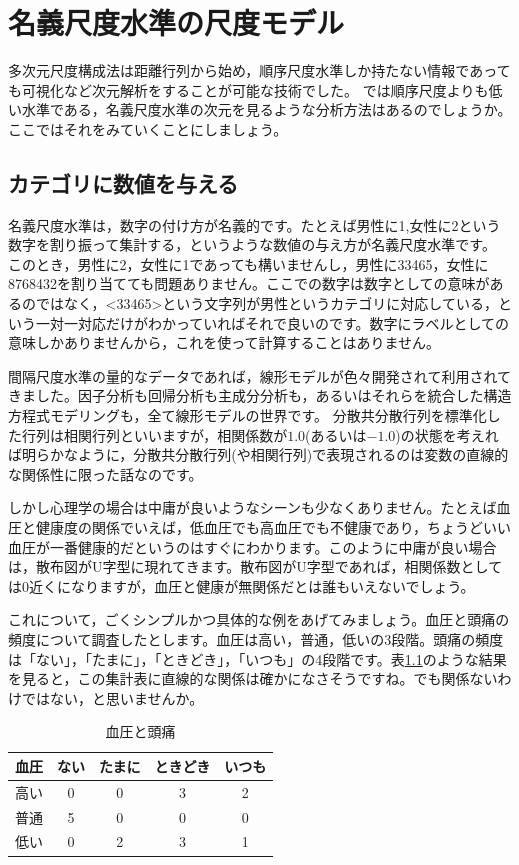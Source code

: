 \documentclass{ltjsbook}
\begin{document}
\chapter{名義尺度水準の尺度モデル}
\label{H09_dual}

多次元尺度構成法は距離行列から始め，順序尺度水準しか持たない情報であっても可視化など次元解析をすることが可能な技術でした。
では順序尺度よりも低い水準である，名義尺度水準の次元を見るような分析方法はあるのでしょうか。ここではそれをみていくことにしましょう。

\section{カテゴリに数値を与える}

名義尺度水準は，数字の付け方が名義的です。たとえば男性に1,女性に2という数字を割り振って集計する，というような数値の与え方が名義尺度水準です。
このとき，男性に2，女性に1であっても構いませんし，男性に33465，女性に8768432を割り当てても問題ありません。ここでの数字は数字としての意味があるのではなく，<33465>という文字列が男性というカテゴリに対応している，という一対一対応だけがわかっていればそれで良いのです。数字にラベルとしての意味しかありませんから，これを使って計算することはありません。

間隔尺度水準の量的なデータであれば，線形モデルが色々開発されて利用されてきました。因子分析も回帰分析も主成分分析も，あるいはそれらを統合した構造方程式モデリングも，全て線形モデルの世界です。
分散共分散行列を標準化した行列は相関行列といいますが，相関係数が$1.0$(あるいは$-1.0$)の状態を考えれば明らかなように，分散共分散行列(や相関行列)で表現されるのは変数の直線的な関係性に限った話なのです。

しかし心理学の場合は中庸が良いようなシーンも少なくありません。たとえば血圧と健康度の関係でいえば，低血圧でも高血圧でも不健康であり，ちょうどいい血圧が一番健康的だというのはすぐにわかります。このように中庸が良い場合は，散布図がU字型に現れてきます。散布図がU字型であれば，相関係数としては0近くになりますが，血圧と健康が無関係だとは誰もいえないでしょう。

これについて，ごくシンプルかつ具体的な例をあげてみましょう。血圧と頭痛の頻度について調査したとします。血圧は高い，普通，低いの3段階。頭痛の頻度は「ない」，「たまに」，「ときどき」，「いつも」の4段階です。表\ref{tbl::14_01}のような結果を見ると，この集計表に直線的な関係は確かになさそうですね。でも関係ないわけではない，と思いませんか。
\begin{table}[h]
    \begin{center}
        \caption{血圧と頭痛}
        \begin{tabular}{c|cccc}
            血圧 & ない & たまに & ときどき & いつも \\
            \hline
            高い & 0  & 0   & 3    & 2   \\
            普通 & 5  & 0   & 0    & 0   \\
            低い & 0  & 2   & 3    & 1   \\
        \end{tabular}
        \label{tbl::14_01}
    \end{center}
\end{table}
\end{document}
